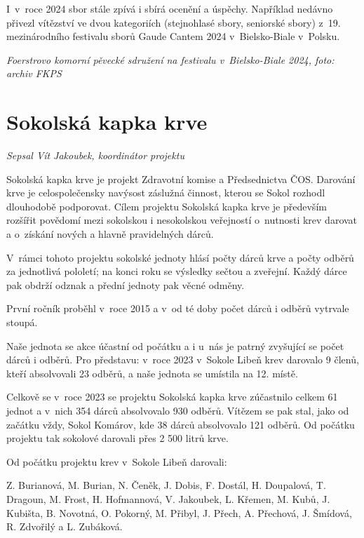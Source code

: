 \documentclass[a5paper, 12pt, twoside]{article}
\begin{document}
I~v~roce 2024 sbor stále zpívá i sbírá ocenění a úspěchy. Například
nedávno přivezl vítězství ve dvou kategoriích (stejnohlasé sbory,
seniorské sbory) z~19. mezinárodního festivalu sborů Gaude Cantem 2024
v~Bielsko-Biale v~Polsku.


\textit{Foerstrovo komorní pěvecké sdružení na festivalu v~Bielsko-Biale
2024, foto: archiv FKPS}

\section{Sokolská kapka krve}

\textit{Sepsal Vít Jakoubek, koordinátor projektu}

Sokolská kapka krve je projekt Zdravotní komise a Předsednictva ČOS.
Darování krve je celospolečensky navýsost záslužná činnost, kterou se
Sokol rozhodl dlouhodobě podporovat. Cílem projektu Sokolská kapka krve
je především rozšířit povědomí mezi sokolskou i nesokolskou veřejností
o~nutnosti krev darovat a o~získání nových a hlavně pravidelných dárců.

V~rámci tohoto projektu sokolské jednoty hlásí počty dárců krve a počty
odběrů za jednotlivá pololetí; na konci roku se výsledky sečtou a
zveřejní. Každý dárce pak obdrží odznak a přední jednoty pak věcné
odměny.

První ročník proběhl v~roce 2015 a v~od té doby počet dárců i odběrů
vytrvale stoupá.

Naše jednota se akce účastní od počátku a i u~nás je patrný zvyšující se
počet dárců i odběrů. Pro představu: v~roce 2023 v~Sokole Libeň krev
darovalo 9 členů, kteří absolvovali 23 odběrů, a naše jednota se
umístila na 12. místě.

Celkově se v~roce 2023 se projektu Sokolská kapka krve zúčastnilo celkem
61 jednot a v~nich 354 dárců absolvovalo 930 odběrů. Vítězem se pak
stal, jako od začátku vždy, Sokol Komárov, kde 38 dárců absolvovalo 121
odběrů. Od počátku projektu tak sokolové darovali přes 2 500 litrů krve.

Od počátku projektu krev v~Sokole Libeň darovali:

Z. Burianová, M. Burian, N. Čeněk, J. Dobis, F. Dostál, H. Doupalová, T.
Dragoun, M. Frost, H. Hofmannová, V. Jakoubek, L. Křemen, M. Kubů, J.
Kubišta, B. Novotná, O. Pokorný, M. Přibyl, J. Přech, A. Přechová, J.
Šmídová, R. Zdvořilý a L. Zubáková.
\end{document}
